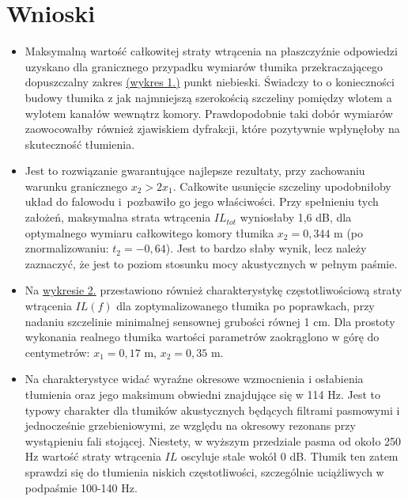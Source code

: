\documentclass{sprawozdanie-agh}
\begin{document}
\section{Wnioski}
\begin{itemize}
\item Maksymalną wartość całkowitej straty wtrącenia na płaszczyźnie odpowiedzi uzyskano dla granicznego przypadku wymiarów tłumika przekraczającego dopuszczalny zakres \hyperref[plane]{(wykres 1.)} {\color{cyan}punkt niebieski}. Świadczy to o konieczności budowy tłumika z jak najmniejszą szerokością szczeliny pomiędzy wlotem a wylotem kanałów wewnątrz komory. Prawdopodobnie taki dobór wymiarów zaowocowałby również zjawiskiem dyfrakcji, które pozytywnie wpłynęłoby na skuteczność tłumienia.
\item Jest to rozwiązanie gwarantujące najlepsze rezultaty, przy zachowaniu warunku granicznego $x_2>2x_1$. Całkowite usunięcie szczeliny upodobniłoby układ do falowodu i~pozbawiło go jego właściwości. Przy spełnieniu tych założeń, maksymalna strata wtrącenia $IL_{tot}$ wyniosłaby 1,6 dB, dla optymalnego wymiaru całkowitego komory tłumika $x_2=0,344$ m (po znormalizowaniu: $t_2=-0,64$). Jest to bardzo słaby wynik, lecz należy zaznaczyć, że jest to poziom stosunku mocy akustycznych w pełnym paśmie.
\item Na \hyperref[wykres2]{wykresie 2.} przestawiono również charakterystykę częstotliwościową straty wtrącenia $IL(f)$ dla zoptymalizowanego tłumika po poprawkach, przy nadaniu szczelinie minimalnej sensownej grubości równej 1 cm. Dla prostoty wykonania realnego tłumika wartości parametrów zaokrąglono w górę do centymetrów: $x_1=0,17$ m, $x_2=0,35$ m.
\item Na charakterystyce widać wyraźne okresowe wzmocnienia i osłabienia tłumienia oraz jego maksimum obwiedni znajdujące się w 114 Hz. Jest to typowy charakter dla tłumików akustycznych będących filtrami pasmowymi i jednocześnie grzebieniowymi, ze względu na okresowy rezonans przy wystąpieniu fali stojącej. Niestety, w wyższym przedziale pasma od około 250 Hz wartość straty wtrącenia $IL$ oscyluje stale wokół 0 dB. Tłumik ten zatem sprawdzi się do tłumienia niskich częstotliwości, szczególnie uciążliwych w podpaśmie 100-140 Hz.
\end{itemize}\newpage
\end{document}
